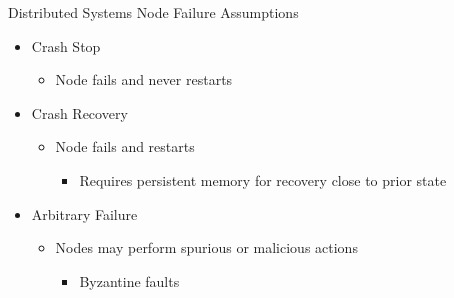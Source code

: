 \documentclass{slide}
\begin{document}
\begin{frame}{Distributed Systems Node Failure Assumptions}
    \vspace{1mm}
    {\LARGE
    \begin{itemize}
        \item<1-> Crash Stop
        \begin{itemize}
            \Large\item Node fails and never restarts
        \end{itemize}
        \vspace{4mm}
        \item<2-> Crash Recovery
        \begin{itemize}
            \Large\item Node fails and restarts
            \begin{itemize}
                \large\item Requires persistent memory for recovery close to prior state
            \end{itemize}
        \end{itemize}
        \vspace{3mm}
        \item<3-> Arbitrary Failure
        \begin{itemize}
            \Large\item Nodes may perform spurious or malicious actions
            \begin{itemize}
                \large\item Byzantine faults
            \end{itemize}
        \end{itemize}
    \end{itemize}
    }
\end{frame}
\end{document}
